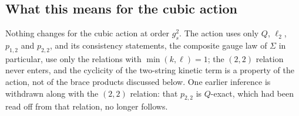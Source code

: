 \subsection{What this means for the cubic action}
\label{ibk:sec:cubic}

Nothing changes for the cubic action at order $g_s^2$. The action uses only $Q$, $\ell_2$, $p_{1,2}$ and $p_{2,2}$, and its consistency statements, the composite gauge law of $\Sigma$ in particular, use only the relations with $\min(k,\ell)=1$; the $(2,2)$ relation never enters, and the cyclicity of the two-string kinetic term is a property of the action, not of the brace products discussed below. One earlier inference is withdrawn along with the $(2,2)$ relation: that $p_{2,2}$ is $Q$-exact, which had been read off from that relation, no longer follows.

